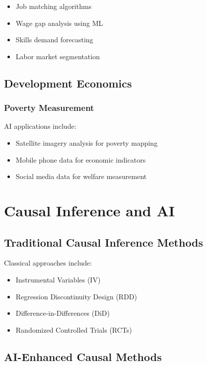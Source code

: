 \documentclass[12pt,a4paper]{article}
\begin{document}
\begin{itemize}
    \item Job matching algorithms
    \item Wage gap analysis using ML
    \item Skills demand forecasting
    \item Labor market segmentation
\end{itemize}

\subsection{Development Economics}

\subsubsection{Poverty Measurement}

AI applications include:
\begin{itemize}
    \item Satellite imagery analysis for poverty mapping
    \item Mobile phone data for economic indicators
    \item Social media data for welfare measurement
\end{itemize}

\section{Causal Inference and AI}

\subsection{Traditional Causal Inference Methods}

Classical approaches include:
\begin{itemize}
    \item Instrumental Variables (IV)
    \item Regression Discontinuity Design (RDD)
    \item Difference-in-Differences (DiD)
    \item Randomized Controlled Trials (RCTs)
\end{itemize}

\subsection{AI-Enhanced Causal Methods}
\end{document}
